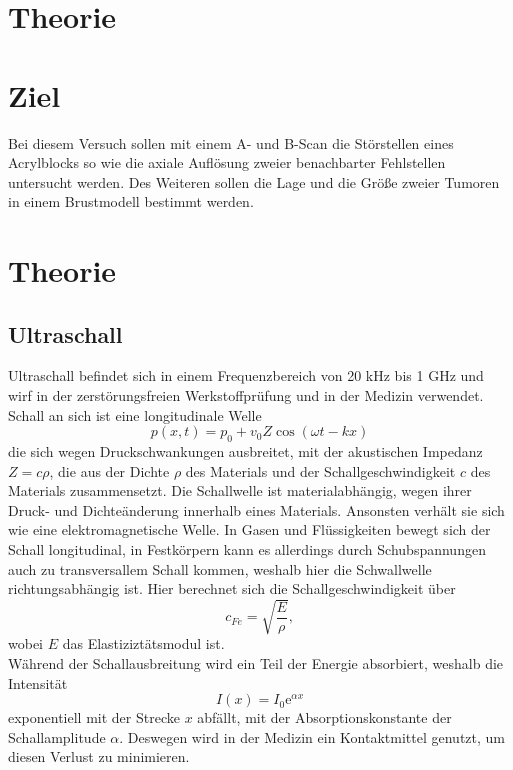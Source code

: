 \section{Theorie}
\label{sec:Theorie}
\section{Ziel}
Bei diesem Versuch sollen mit einem A- und B-Scan die Störstellen eines Acrylblocks so wie die axiale Auflösung zweier benachbarter Fehlstellen untersucht werden. Des Weiteren sollen die Lage und die Größe zweier Tumoren in einem Brustmodell bestimmt werden. 

\section{Theorie}
\subsection{Ultraschall}
Ultraschall befindet sich in einem Frequenzbereich von 20 kHz bis 1 GHz und wirf in der zerstörungsfreien Werkstoffprüfung und in der Medizin verwendet. Schall an sich ist eine longitudinale Welle
\begin{equation*}
  p(x,t)=p_0+v_0 Z \cos(\omega t-kx)
\end{equation*}
die sich wegen Druckschwankungen ausbreitet, mit der akustischen Impedanz $Z=c\rho$, die aus der Dichte $\rho$ des Materials und der Schallgeschwindigkeit $c$ des Materials zusammensetzt. Die Schallwelle ist materialabhängig, wegen ihrer Druck- und Dichteänderung innerhalb eines Materials. Ansonsten verhält sie sich wie eine elektromagnetische Welle. In Gasen und Flüssigkeiten bewegt sich der Schall longitudinal, in Festkörpern kann es allerdings durch Schubspannungen auch zu transversallem Schall kommen, weshalb hier die Schwallwelle richtungsabhängig ist. Hier berechnet sich die Schallgeschwindigkeit über
\begin{equation*}
  c_{Fe}=\sqrt{\frac{E}{\rho}},
\end{equation*}
wobei $E$ das Elastiziztätsmodul ist.\\
Während der Schallausbreitung wird ein Teil der Energie absorbiert, weshalb die Intensität
\begin{equation*}
  I(x)=I_0 \textrm{e}^{\alpha x}
\end{equation*} 
exponentiell mit der Strecke $x$ abfällt, mit der Absorptionskonstante der Schallamplitude $\alpha$. Deswegen wird in der Medizin ein Kontaktmittel genutzt, um diesen Verlust zu minimieren.\\
